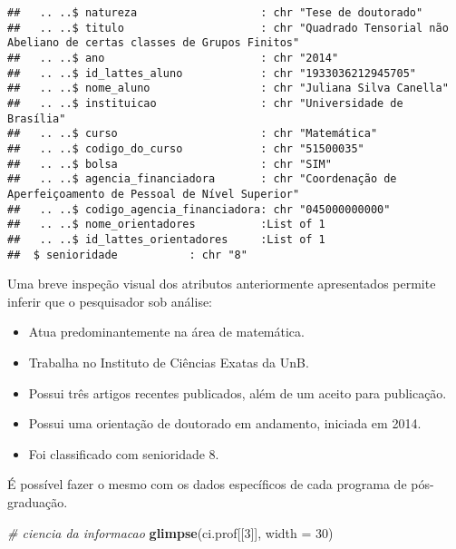 \documentclass[]{article}
\newenvironment{Shaded}{\begin{snugshade}}{\end{snugshade}}
\newcommand{\KeywordTok}[1]{\textcolor[rgb]{0.13,0.29,0.53}{\textbf{#1}}}
\newcommand{\DataTypeTok}[1]{\textcolor[rgb]{0.13,0.29,0.53}{#1}}
\newcommand{\DecValTok}[1]{\textcolor[rgb]{0.00,0.00,0.81}{#1}}
\newcommand{\CommentTok}[1]{\textcolor[rgb]{0.56,0.35,0.01}{\textit{#1}}}
\newcommand{\NormalTok}[1]{#1}
\providecommand{\tightlist}{%
  \setlength{\itemsep}{0pt}\setlength{\parskip}{0pt}}
\begin{document}
\begin{verbatim}
##   .. ..$ natureza                   : chr "Tese de doutorado"
##   .. ..$ titulo                     : chr "Quadrado Tensorial não Abeliano de certas classes de Grupos Finitos"
##   .. ..$ ano                        : chr "2014"
##   .. ..$ id_lattes_aluno            : chr "1933036212945705"
##   .. ..$ nome_aluno                 : chr "Juliana Silva Canella"
##   .. ..$ instituicao                : chr "Universidade de Brasília"
##   .. ..$ curso                      : chr "Matemática"
##   .. ..$ codigo_do_curso            : chr "51500035"
##   .. ..$ bolsa                      : chr "SIM"
##   .. ..$ agencia_financiadora       : chr "Coordenação de Aperfeiçoamento de Pessoal de Nível Superior"
##   .. ..$ codigo_agencia_financiadora: chr "045000000000"
##   .. ..$ nome_orientadores          :List of 1
##   .. ..$ id_lattes_orientadores     :List of 1
##  $ senioridade           : chr "8"
\end{verbatim}

Uma breve inspeção visual dos atributos anteriormente apresentados
permite inferir que o pesquisador sob análise:

\begin{itemize}
\tightlist
\item
  Atua predominantemente na área de matemática.
\item
  Trabalha no Instituto de Ciências Exatas da UnB.
\item
  Possui três artigos recentes publicados, além de um aceito para
  publicação.
\item
  Possui uma orientação de doutorado em andamento, iniciada em 2014.
\item
  Foi classificado com senioridade 8.
\end{itemize}

É possível fazer o mesmo com os dados específicos de cada programa de
pós-graduação.

\begin{Shaded}
\begin{Highlighting}[]
\CommentTok{# ciencia da informacao}
\KeywordTok{glimpse}\NormalTok{(ci.prof[[}\DecValTok{3}\NormalTok{]], }\DataTypeTok{width =} \DecValTok{30}\NormalTok{)}
\end{Highlighting}
\end{Shaded}
\end{document}

